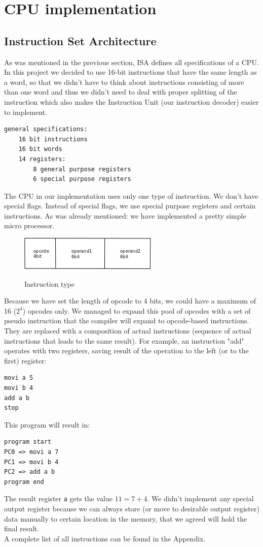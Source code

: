 \documentclass[12pt,a4paper]{scrartcl}
\begin{document}
\newpage
\section{CPU implementation}
\subsection{Instruction Set Architecture}
As was mentioned in the previous section, ISA defines all specifications of a CPU. In this project we decided to use 16-bit instructions that have the same length as a word, so that we didn't have to think about instructions consisting of more than one word and thus we didn't need to deal with proper splitting of the instruction  which also makes the Instruction Unit (our instruction decoder) easier to implement.
\begin{verbatim}
general specifications:
    16 bit instructions
    16 bit words
    14 registers:
        8 general purpose registers
        6 special purpose registers
\end{verbatim}

The CPU in our implementation uses only one type of instruction. We don't have special flags. Instead of special flags, we use special purpose registers and certain instructions. As was already mentioned: we have implemented a pretty simple micro processor.
\begin{figure}[h!]
	\centering
	\includegraphics[scale=0.6]{pics/instruction1.png}\\
	\caption{Instruction type}
\end{figure}
Because we have set the length of opcode to 4 bits, we could have a maximum of 16 (\(2^4\)) opcodes only. We managed to expand this pool of opcodes with a set of pseudo instruction that the compiler will expand to opcode-based instructions. They are replaced with a composition of actual instructions (sequence of actual instructions that leads to the same result). For example, an instruction "add" operates with two registers, saving result of the operation to the left (or to the first) register:
\begin{verbatim}
movi a 5
movi b 4
add a b
stop
\end{verbatim}
This program will result in:
\begin{verbatim}
program start
PC0 => movi a 7
PC1 => movi b 4
PC2 => add a b
program end
\end{verbatim}
The result register \texttt{a} gets the value \(11 = 7 + 4\). We didn't implement any special output register because we can always store (or move to desirable output register) data manually to certain location in the memory, that we agreed will hold the final result.\\
A complete list of all instructions can be found in the Appendix.
\end{document}
